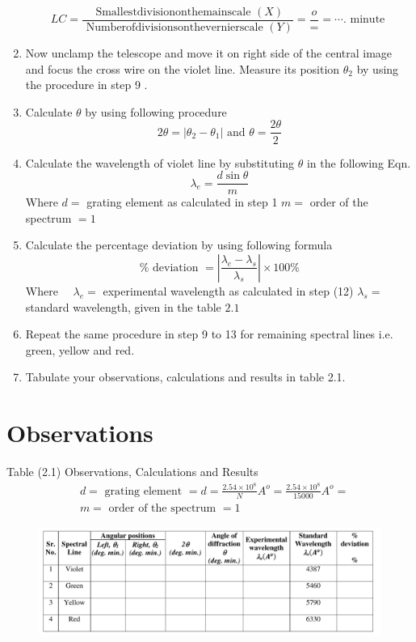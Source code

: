 \documentclass[11pt]{article}
\begin{document}
\begin{enumerate}
$$
L C=\frac{\text { Smallestdivisiononthemainscale }(X)}{\text { Numberofdivisionsonthevernierscale }(Y)}=\frac{o}{=}=\cdots . \text { minute }
$$
	\item Now unclamp the telescope and move it on right side of the central image and focus the cross wire on the violet line. Measure its position $\theta_{2}$ by using the procedure in step 9 .
	\item Calculate $\theta$ by using following procedure
$$
2 \theta=\left|\theta_{2}-\theta_{1}\right| \text { and } \theta=\frac{2 \theta}{2}
$$
	\item Calculate the wavelength of violet line by substituting $\theta$ in the following Eqn.
$$
\lambda_{e}=\frac{d \sin \theta}{m}
$$
Where $d=$ grating element as calculated in step 1 $m=$ order of the spectrum $=1$
	\item Calculate the percentage deviation by using following formula
$$
\% \text { deviation }=\left|\frac{\lambda_{e}-\lambda_{s}}{\lambda_{s}}\right| \times 100 \%
$$
Where $\quad \lambda_{e}=$ experimental wavelength as calculated in step (12) $\lambda_{s}=$ standard wavelength, given in the table $2.1$
	\item Repeat the same procedure in step 9 to 13 for remaining spectral lines i.e. green, yellow and red.
	\item Tabulate your observations, calculations and results in table 2.1.


	\end{enumerate}
\clearpage

	\section{Observations}

Table (2.1) Observations, Calculations and Results
$$
\begin{aligned}
	&d=\text { grating element }=d=\frac{2.54 \times 10^{8}}{N} A^{o}=\frac{2.54 \times 10^{8}}{15000} A^{o}= \\
	&m=\text { order of the spectrum }=1
\end{aligned}
$$

	\begin{figure}[H]
	\centering
	\includegraphics[scale=0.45]{table.png}
	\label{it}
\end{figure}
\end{document}
